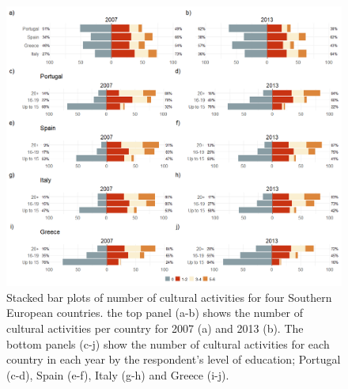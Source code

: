 \documentclass{article}
\begin{document}
\begin{figure}
    \centering
    \includegraphics[width=1.0\textwidth]{Plots/cult-cat2-by-year-by-country-combo.png}
    \caption{Stacked bar plots of number of cultural activities for four Southern European countries. the top panel (a-b) shows the number of cultural activities per country for 2007 (a) and 2013 (b). The bottom panels (c-j) show the number of cultural activities for each country in each year by the respondent's level of education; Portugal (c-d), Spain (e-f), Italy (g-h) and Greece (i-j).}
    \label{fig: main}
\end{figure}


\end{document}
